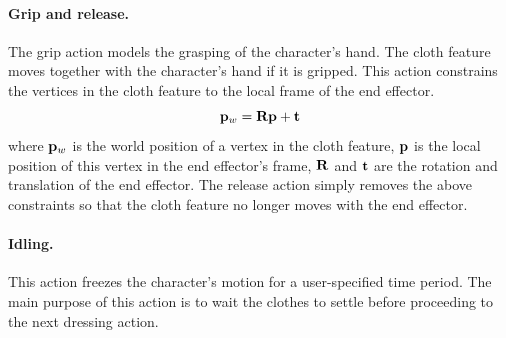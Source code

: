 \paragraph{Grip and release.}
The grip action models the grasping of the character's hand. The cloth feature moves together with the character's hand if it is gripped. This action constrains the vertices in the cloth feature to the local frame of the end effector.
\begin{displaymath}
\mathbf{p}_w = \mathbf{Rp} + \mathbf{t}
\end{displaymath}
where $\mathbf{p}_w$ is the world position of a vertex in the cloth feature, $\mathbf{p}$ is the local position of this vertex in the end effector's frame, $\mathbf{R}$ and $\mathbf{t}$ are the rotation and translation of the end effector. The release action simply removes the above constraints so that the cloth feature no longer moves with the end effector.

\paragraph{Idling.} This action freezes the character's motion for a user-specified time period. The main purpose of this action is to wait the clothes to settle before proceeding to the next dressing action.
